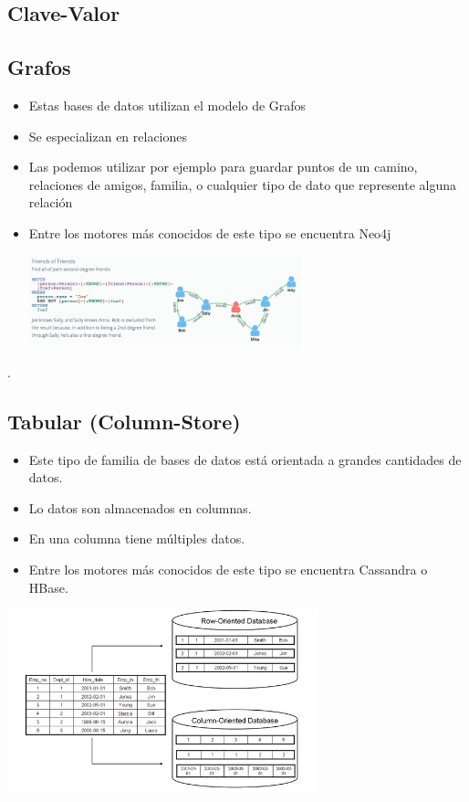 \documentclass[%
 reprint,
 amsmath,amssymb,
 aps,
]{revtex4-1}
\begin{document}
\subsection{Clave-Valor}


\subsection{Grafos}
\begin{itemize}
		\item Estas bases de datos utilizan el modelo de Grafos
		\item Se especializan en relaciones
		\item Las podemos utilizar por ejemplo para guardar puntos de un camino, relaciones de amigos, familia, o cualquier tipo de  dato que represente alguna relación
                     \item Entre los motores más conocidos de este tipo se encuentra Neo4j
                     \begin{center}
		\includegraphics[width=8cm]{./Imagenes/4}
		\end{center}	
	          \end{itemize}
.
\subsection{Tabular (Column-Store)}
\begin{itemize}
		\item Este tipo de familia de bases de datos está orientada a grandes cantidades de datos.
		\item Lo datos son almacenados en columnas.
		\item En una columna tiene múltiples datos.
                     \item Entre los motores más conocidos de este tipo se encuentra Cassandra o HBase.
	          \end{itemize} 
 \begin{center}
	\includegraphics[width=9cm]{./Imagenes/5}
\end{center}	
\end{document}
